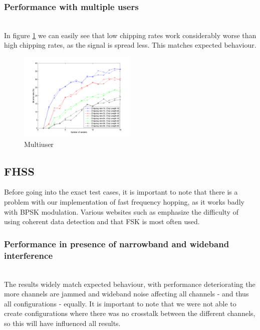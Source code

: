 		\subsubsection{Performance with multiple users}~\\
		
		In figure \ref{fig:dsss_multiuser} we can easily see that low chipping rates work considerably worse than high chipping rates, as the signal is spread less. This matches expected behaviour. 
		\begin{figure}[H]
			\includegraphics[width=0.5\textwidth]{imgs/results/plot_mode_dsss-test_numSenders-rep_20-dataRate_8-dataLength_128.png}
			\caption{Multiuser}
			\label{fig:dsss_multiuser}
		\end{figure}
		
		
	
	\subsection{FHSS}
	
	Before going into the exact test cases, it is important to note that there is a problem with our implementation of fast frequency hopping, as it works badly with BPSK modulation. Various websites such as \cite{web-nl} emphasize the difficulty of using coherent data detection and that FSK is most often used. 
		\subsubsection{Performance in presence of narrowband and wideband interference}~\\
		
		The results widely match expected behaviour, with performance deteriorating the more channels are jammed and wideband noise affecting all channels - and thus all configurations - equally. It is important to note that we were not able to create configurations where there was no crosstalk between the different channels, so this will have influenced all results.
		
